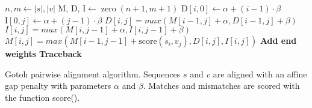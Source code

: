 \begin{algorithm}[hp]
\begin{algorithmic}[1]
  \State $n, m \gets |s|, |v|$
  \State $\text{M, D, I} \gets \operatorname{zero}(n+1, m+1)$ 
   
    \State $\text{D}[i, 0] \gets \alpha + (i - 1) \cdot \beta$
  \EndFor
   
    \State $\text{I}[0, j] \gets \alpha + (j - 1) \cdot \beta$
  \EndFor
   
      \State $D[i, j] = max(M[i-1, j] + \alpha, D[i-1, j] + \beta)$
      \State $I[i, j] = max(M[i, j-1] + \alpha, I[i, j-1] + \beta)$
      \State $M[i, j] = max(M[i-1, j-1] + \text{score}(s_i, v_j), D[i, j], I[i, j])$
    \EndFor
  \EndFor
\State \textbf{Add end weights}
\State \textbf{Traceback}
\EndFunction
\end{algorithmic}
\caption[Gotoh Algorithm]{Gotoh pairwise alignment algorithm. Sequences $s$ and $v$ are aligned with an affine gap penalty with parameters $\alpha$ and $\beta$. Matches and mismatches are scored with the function score().}\label{alg:gotoh}
\end{algorithm}